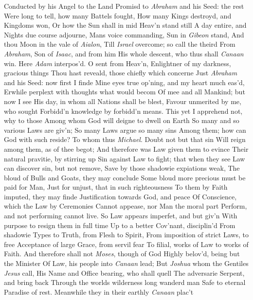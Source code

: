 \documentclass[11pt]{book}
\newcounter {first}
\begin{document}
Conducted by his Angel to the Land 
Promisd to \textit{Abraham} and his Seed: the rest 
Were long to tell, how many Battels fought, 
How many Kings destroyd, and Kingdoms won, 
Or how the Sun shall in mid Heav'n stand still 
A day entire, and Nights due course adjourne, 
Mans voice commanding, Sun in \textit{Gibeon} stand, 
And thou Moon in the vale of \textit{Aialon}, 
Till \textit{Israel} overcome; so call the theird 
From \textit{Abraham}, Son of \textit{Isaac}, and from him 
His whole descent, who thus shall \textit{Canaan} win. 
\quad Here \textit{Adam} interpos'd.  O sent from Heav'n, 
Enlightner of my darkness, gracious things 
Thou hast reveald, those chiefly which concerne 
Just \textit{Abraham} and his Seed: now first I finde 
Mine eyes true op'ning, and my heart much eas'd, 
Erwhile perplext with thoughts what would becom 
Of mee and all Mankind; but now I see 
His day, in whom all Nations shall be blest, 
Favour unmerited by me, who sought 
Forbidd'n knowledge by forbidd'n means. 
This yet I apprehend not, why to those 
Among whom God will deigne to dwell on Earth 
So many and so various Laws are giv'n; 
So many Laws argue so many sins 
Among them; how can God with such reside? 
\quad To whom thus \textit{Michael}.  Doubt not but that sin 
Will reign among them, as of thee begot; 
And therefore was Law given them to evince 
Their natural pravitie, by stirring up 
Sin against Law to fight; that when they see 
Law can discover sin, but not remove, 
Save by those shadowie expiations weak, 
The bloud of Bulls and Goats, they may conclude 
Some bloud more precious must be paid for Man, 
Just for unjust, that in such righteousness 
To them by Faith imputed, they may finde 
Justification towards God, and peace 
Of Conscience, which the Law by Ceremonies 
Cannot appease, nor Man the moral part 
Perform, and not performing cannot live. 
So Law appears imperfet, and but giv'n 
With purpose to resign them in full time 
Up to a better Cov'nant, disciplin'd 
From shadowie Types to Truth, from Flesh to Spirit, 
From imposition of strict Laws, to free 
Acceptance of large Grace, from servil fear 
To filial, works of Law to works of Faith. 
And therefore shall not \textit{Moses}, though of God 
Highly belov'd, being but the Minister 
Of Law, his people into \textit{Canaan} lead; 
But \textit{Joshua} whom the Gentiles \textit{Jesus} call, 
His Name and Office bearing, who shall quell 
The adversarie Serpent, and bring back 
Through the worlds wilderness long wanderd man 
Safe to eternal Paradise of rest. 
Meanwhile they in their earthly \textit{Canaan} plac't 
\end{document}
